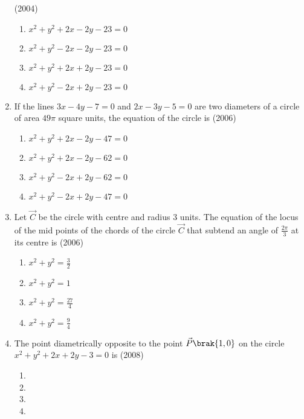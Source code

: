 \begin{enumerate}[label=\thesubsection.\arabic*.,ref=\thesubsection.\theenumi]
\hfill{(2004)}
\begin{multicols}{2}
\begin{enumerate}
\item $x^2+y^2+2x-2y-23=0$
\item $x^2+y^2-2x-2y-23=0$
\item $x^2+y^2+2x+2y-23=0$
\item $x^2+y^2-2x+2y-23=0$
\end{enumerate}
\end{multicols}
\item If the lines $3x-4y-7=0$ and $2x-3y-5=0$ are two diameters of a circle of area $49\pi$ square units,  the equation of the circle is 
\hfill{(2006)}
\begin{multicols}{2}
\begin{enumerate}
\item $x^2+y^2+2x-2y-47=0$
\item $x^2+y^2+2x-2y-62=0$
\item $x^2+y^2-2x+2y-62=0$
\item $x^2+y^2-2x+2y-47=0$
\end{enumerate}
\end{multicols}
\item Let $\vec{C}$ be the circle with centre  and radius 3 units. The equation of the locus of the mid points of the chords of the circle $\vec{C}$ that subtend an angle of $\frac{2\pi}{3}$ at its centre is
\hfill{(2006)}
\begin{multicols}{4}
\begin{enumerate}
\item $x^2+y^2=\frac{3}{2}$
\item $x^2+y^2=1$
\item $x^2+y^2=\frac{27}{4}$
\item $x^2+y^2=\frac{9}{4}$
\end{enumerate}
\end{multicols}
\item The point diametrically opposite to the point $\vec{P}\brak{1, 0}$ on the circle $x^2+y^2+2x+2y-3=0$ is 
\hfill{(2008)}
\begin{multicols}{4}
\begin{enumerate}
\item {}
\item {}
\item {}
\item {}
\end{enumerate}
\end{multicols}

\end{enumerate}
